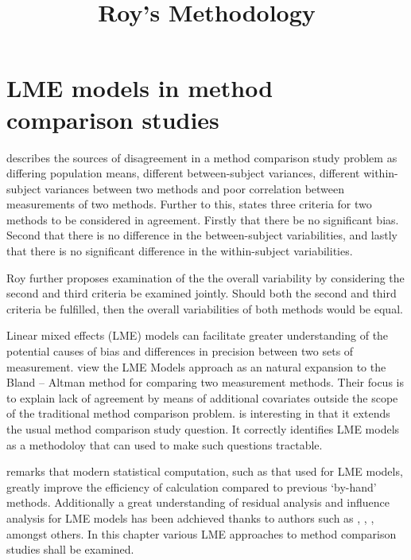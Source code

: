 \documentclass[12pt, a4paper]{article}
\title{Roy's Methodology}
\author{ } \date{ }
\theoremstyle{plain}
\theoremstyle{definition}
\theoremstyle{remark}
\begin{document}
	\tableofcontents
	\newpage
	\section{LME models in method comparison studies}
		\citet{Barnhart} describes the sources of disagreement in a method comparison study problem as
		differing population means, different between-subject variances, different within-subject variances between two methods and poor
		correlation between measurements of two methods. Further to this, \citet{ARoy2009} states three criteria for two methods to be considered in agreement. Firstly that there be no significant bias. Second that there is no difference in the between-subject variabilities, and lastly that there is no significant difference in the within-subject variabilities. 
		
		Roy further proposes examination of the the overall variability by considering the second and third criteria be examined jointly. Should both the second and third criteria be fulfilled, then the overall variabilities of both methods would be equal.
		
		Linear mixed effects (LME) models can facilitate greater understanding of the potential causes of bias and differences in precision between two sets of measurement. \citet{LaiShiao} view the LME Models approach as an natural expansion to the Bland – Altman method for comparing two measurement methods. Their focus is to explain lack of agreement by means of additional covariates outside the scope of the traditional method comparison problem. \citet{LaiShiao} is interesting in that it extends the usual method comparison study question. It correctly identifies LME models as a methodoloy that can used to make such questions tractable.
	
\citet{BXC2008} remarks that modern statistical computation, such as that used for LME models, greatly improve the efficiency of
	calculation compared to previous `by-hand' methods. Additionally a great understanding of residual analysis and influence analysis for LME models has been adchieved thanks to authors such as \citet{schab}, \citet{CPJ}, \citet{cook86} \citet{west}, amongst others. In this chapter various LME approaches to method comparison studies shall
	be examined.
	
\end{document}
